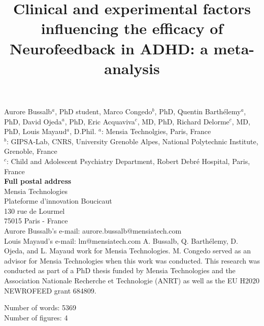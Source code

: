 

\title{Clinical and experimental factors influencing the efficacy of Neurofeedback in ADHD: a meta-analysis} %
\maketitle
\noindent Aurore Bussalb$^a$, PhD student, Marco Congedo$^b$, PhD, Quentin Barth\'elemy$^a$, PhD, David Ojeda$^a$, PhD, 
Eric Acquaviva$^c$, MD, PhD, Richard Delorme$^c$, MD, PhD, Louis Mayaud$^a$, D.Phil. 
\smallbreak
\noindent $^a$: Mensia Technolgies, Paris, France \\
\noindent $^b$: GIPSA-Lab, CNRS, University Grenoble Alpes, National Polytechnic Institute, Grenoble, France \\
\noindent $^c$: Child and Adolescent Psychiatry Department, Robert Debré Hospital, Paris, France \\ 
\smallbreak
\noindent\textbf{Full postal address} \\
Mensia Technologies \\
Plateforme d'innovation Boucicaut \\
130 rue de Lourmel \\
75015 Paris - France \\
Aurore Bussalb's e-mail: aurore.bussalb@mensiatech.com \\
Louis Mayaud's e-mail: lm@mensiatech.com 
\smallbreak
\noindent A. Bussalb, Q. Barth\'elemy, D. Ojeda, and L. Mayaud work for Mensia Technologies.
M. Congedo served as an advisor for Mensia Technologies when this work was conducted. 
\smallbreak
\noindent This research was conducted as part of a PhD thesis funded by Mensia Technologies and the Association Nationale 
Recherche et Technologie (ANRT) as well as the EU H2020 NEWROFEED grant 684809.

\noindent Number of words: 5369 \\
\noindent Number of figures: 4 

